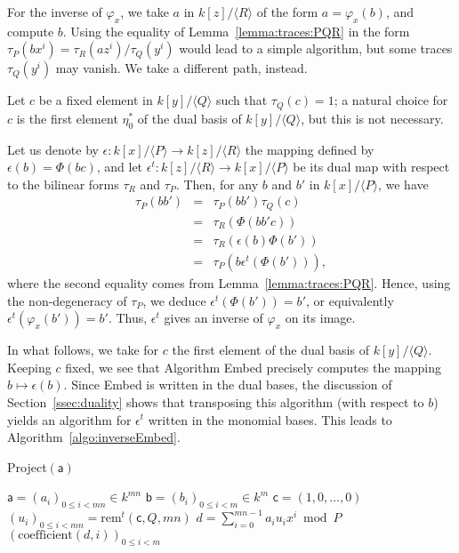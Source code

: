 \documentclass{sig-alternate}
\def\va {\ensuremath{\mathsf{a}}}
\def\vb {\ensuremath{\mathsf{b}}}
\def\vc {\ensuremath{\mathsf{c}}}
\def\rem {\ensuremath{\mathrm{rem}}}
\def\coeff {\ensuremath{\mathrm{coefficient}}}
\newcommand{\ang}[1]{\langle#1\rangle}
\begin{document}
For the inverse of $\varphi_x$, we take $a$ in $k[z]/\langle R
\rangle$ of the form $a=\varphi_x(b)$, and compute $b$. Using the
equality of Lemma~\ref{lemma:traces:PQR} in the form $\tau_P(b x^i)
=\tau_R(a z^i)/\tau_Q(y^i)$ would lead to a simple algorithm, but some
traces $\tau_Q(y^i)$ may vanish. We take a different path, instead.

Let $c$ be a fixed element in $k[y]/\ang{Q}$ such that $\tau_Q(c)=1$;
a natural choice for $c$ is the first element $\eta^\ast_0$ of the
dual basis of $k[y]/\ang{Q}$, but this is not necessary.

Let us denote by $\epsilon: k[x]/\ang{P} \to k[z]/\ang{R}$ the mapping
defined by $\epsilon(b) = \Phi(b c)$, and let $\epsilon^t:
k[z]/\ang{R} \to k[x]/\ang{P}$ be its dual map with respect to the
bilinear forms $\tau_R$ and $\tau_P$. Then, for any $b$ and $b'$ in 
$k[x]/\ang{P}$, we have
\begin{eqnarray*}
\tau_P(b b') &=&  \tau_P(b b')\tau_Q(c) \\
&=& \tau_R( \Phi(b b' c))\\
&=& \tau_R( \epsilon(b) \Phi(b')) \\
&=& \tau_P(b \epsilon^t(\Phi(b'))),
\end{eqnarray*}
where the second equality comes from
Lemma~\ref{lemma:traces:PQR}. Hence, using the non-degeneracy of
$\tau_P$, we deduce $\epsilon^t(\Phi(b')) = b'$, or equivalently
$\epsilon^t(\varphi_x(b')) = b'$. Thus, $\epsilon^t$ gives an 
inverse of $\varphi_x$ on its image.

In what follows, we take for $c$ the first element of the dual basis
of $k[y]/\ang{Q}$. Keeping $c$ fixed, we see that Algorithm Embed
precisely computes the mapping $b\mapsto \epsilon(b)$. Since Embed is
written in the dual bases, the discussion of
Section~\ref{ssec:duality} shows that transposing this algorithm (with
respect to $b$) yields an algorithm for $\epsilon^t$ written in the
monomial bases. This leads to Algorithm~\ref{algo:inverseEmbed}.

\begin{algorithm}[H]
  \caption{Project$(\va)$}
  \begin{algorithmic}[1]
    \REQUIRE $\va=(a_i)_{0 \le i < mn} \in k^{mn}$
    \ENSURE $\vb=(b_i)_{0 \le i < m} \in k^m$
    \STATE $\vc=(1,0,\dots,0)$ 
    \STATE $(u_i)_{0\le i<mn} = \rem^t(\vc,Q,mn)$
    \STATE\label{algo:inverseEmbed:dotprod} $d = \sum_{i=0}^{mn-1} a_i u_i x^i  \bmod P$
    \RETURN\label{algo:inverseEmbed:mod} $(\coeff(d,i))_{0 \le i < m}$
  \end{algorithmic}\label{algo:inverseEmbed}
\end{algorithm}
\end{document}
